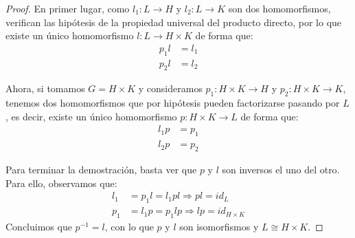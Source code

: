 \begin{teo}
   \begin{proof}
       En primer lugar, como $l_1:L\to H$ y $l_2:L\to K$ son dos homomorfismos, verifican las hipótesis de la propiedad universal del producto directo, por lo que existe un único homomorfismo $l:L\to H\times K$ de forma que:
       \begin{align*}
           p_1l &= l_1 \\
           p_2l &= l_2
       \end{align*}
       \begin{figure}[H]
           \centering
       \end{figure}
       \noindent
       Ahora, si tomamos $G = H\times K$ y consideramos $p_1:H\times K\to H$ y $p_2:H\times K\to K$, tenemos dos homomorfismos que por hipótesis pueden factorizarse pasando por $L$, es decir, existe un único homomorfismo $p:H\times K\to L$ de forma que:
       \begin{align*}
           l_1p &= p_1 \\
           l_2p &= p_2
       \end{align*}
       \begin{figure}[H]
           \centering
       \end{figure}
       \noindent
       Para terminar la demostración, basta ver que $p$ y $l$ son inversos el uno del otro. Para ello, observamos que:
       \begin{align*}
           l_1 &= p_1l = l_1pl \Longrightarrow pl = id_{L} \\
           p_1 &= l_1p = p_1lp \Longrightarrow lp = id_{H\times K}
       \end{align*}
       Concluimos que $p^{-1} = l$, con lo que $p$ y $l$ son isomorfismos y $L\cong H\times K$.
   \end{proof}
\end{teo}

